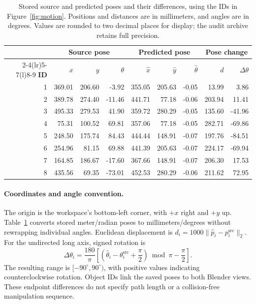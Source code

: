 \begin{table}[H]
\centering\small
\caption{Stored source and predicted poses and their differences, using the IDs in Figure~\ref{fig:motion}. Positions and distances are in millimeters, and angles are in degrees. Values are rounded to two decimal places for display; the audit archive retains full precision.}
\label{tab:motion_poses}
\setlength{\tabcolsep}{3pt}
\begin{tabular*}{\linewidth}{@{}r@{\extracolsep{\fill}}rrrrrrrr@{}}\toprule
& \multicolumn{3}{c}{Source pose} & \multicolumn{3}{c}{Predicted pose} & \multicolumn{2}{c}{Pose change} \\
\cmidrule(lr){2-4}\cmidrule(lr){5-7}\cmidrule(l){8-9}
\textbf{ID} & $x$ & $y$ & $\theta$ & $\hat x$ & $\hat y$ & $\hat\theta$ & $d$ & $\Delta\theta$ \\\midrule
1 & 369.01 & 206.60 & -3.92 & 355.05 & 205.63 & -0.05 & 13.99 & 3.86 \\
2 & 389.78 & 274.40 & -11.46 & 441.71 & 77.18 & -0.06 & 203.94 & 11.41 \\
3 & 495.33 & 279.53 & 41.90 & 359.72 & 280.29 & -0.05 & 135.60 & -41.96 \\
4 & 75.31 & 100.52 & 69.81 & 357.06 & 77.18 & -0.05 & 282.71 & -69.86 \\
5 & 248.50 & 175.74 & 84.43 & 444.44 & 148.91 & -0.07 & 197.76 & -84.51 \\
6 & 254.96 & 81.15 & 69.88 & 441.39 & 205.63 & -0.07 & 224.17 & -69.94 \\
7 & 164.85 & 186.67 & -17.60 & 367.66 & 148.91 & -0.07 & 206.30 & 17.53 \\
8 & 435.56 & 69.35 & -73.01 & 452.53 & 280.29 & -0.06 & 211.62 & 72.95 \\
\bottomrule
\end{tabular*}
\end{table}

\newpage
\paragraph{Coordinates and angle convention.}
The origin is the workspace's bottom-left corner, with $+x$ right and $+y$ up. Table~\ref{tab:motion_poses} converts stored meter/radian poses to millimeters/degrees without rewrapping individual angles. Euclidean displacement is $d_i=1000\|\hat p_i-p_i^{\mathrm{src}}\|_2$. For the undirected long axis, signed rotation is
\begin{equation}
\Delta\theta_i=\frac{180}{\pi}\left[\left(\hat\theta_i-\theta_i^{\mathrm{src}}+\frac\pi2\right)\bmod\pi-\frac\pi2\right].
\end{equation}
The resulting range is $[-90^\circ,90^\circ)$, with positive values indicating counterclockwise rotation. Object IDs link the saved poses to both Blender views. These endpoint differences do not specify path length or a collision-free manipulation sequence.

